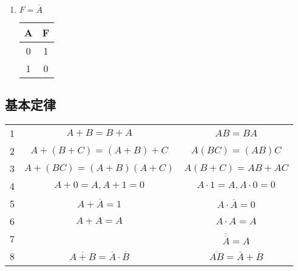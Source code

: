 \begin{enumerate}
    \item $F=\overline A$

          \begin{table}[!htbp]
              \centering
              \begin{tabular}{|c|c|}
                  \hline
                  A & F \\
                  \hline
                  0 & 1 \\
                  \hline
                  1 & 0 \\
                  \hline
              \end{tabular}
          \end{table}

\end{enumerate}

\newpage

\subsection{基本定律}

\begin{table}[!htbp]
    \centering
    \begin{tabular}{c|c|c}
        \toprule
        1 & $A+B=B+A$                                      & $AB=BA$                                 \\
        2 & $A+(B+C)=(A+B)+C$                              & $A(BC)=(AB)C$                           \\
        3 & $A+(BC)=(A+B)(A+C)$                            & $A(B+C)=AB+AC$                          \\
        4 & $A+0=A , A+1=0$                                & $A \cdot 1=A , A \cdot 0=0$             \\
        5 & $A+\overline A =1$                             & $A \cdot \overline A  =0$               \\
        6 & $A+A=A$                                        & $A \cdot A=A$                           \\
        7 &                                                & $\overline{\overline A}=A$              \\
        8 & $\overline{A+B}=\overline A \cdot \overline B$ & $\overline{AB}=\overline A+\overline B$ \\
        \bottomrule
    \end{tabular}
\end{table}

